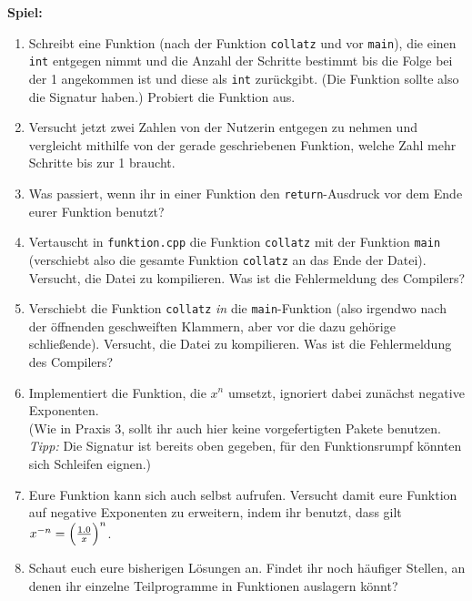 \textbf{Spiel:}
\begin{enumerate}
	\item Schreibt eine Funktion (nach der Funktion \texttt{collatz} und vor \texttt{main}), die einen \texttt{int} entgegen nimmt und die Anzahl der Schritte bestimmt bis die Folge bei der 1 angekommen ist und diese als \texttt{int} zurückgibt.
	(Die Funktion sollte also die Signatur  haben.)
	Probiert die Funktion aus.
	\item Versucht jetzt zwei Zahlen von der Nutzerin entgegen zu nehmen und vergleicht mithilfe von der gerade geschriebenen Funktion, welche Zahl mehr Schritte bis zur 1 braucht.
    \item Was passiert, wenn ihr in einer Funktion den \texttt{return}-Ausdruck vor dem Ende eurer Funktion benutzt?
    \item Vertauscht in \texttt{funktion.cpp} die Funktion \texttt{collatz} mit der Funktion \texttt{main} (verschiebt also die gesamte Funktion \texttt{collatz} an das Ende der Datei).
        Versucht, die Datei zu kompilieren.
        Was ist die Fehlermeldung des Compilers?
    \item Verschiebt die Funktion \texttt{collatz} \emph{in} die \texttt{main}-Funktion (also irgendwo nach der öffnenden geschweiften Klammern, aber vor die dazu gehörige schließende).
        Versucht, die Datei zu kompilieren. Was ist die Fehlermeldung des Compilers?
    \item Implementiert die Funktion, die $x^n$ umsetzt, ignoriert dabei zunächst negative Exponenten. \\
        (Wie in Praxis 3, sollt ihr auch hier keine vorgefertigten Pakete benutzen. \emph{Tipp:} Die Signatur ist bereits oben gegeben, für den Funktionsrumpf könnten sich Schleifen eignen.)
    \item Eure Funktion kann sich auch selbst aufrufen. Versucht damit eure Funktion auf negative Exponenten zu erweitern, indem ihr benutzt, dass gilt $x^{-n} = \Bigl(\frac{1.0}{x}\Bigr)^n$.
    \item Schaut euch eure bisherigen Lösungen an.
        Findet ihr noch häufiger Stellen, an denen ihr einzelne Teilprogramme in Funktionen auslagern könnt?
\end{enumerate}
